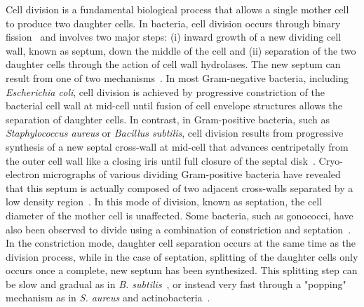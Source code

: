 Cell division is a fundamental biological process that allows a single mother cell to produce two daughter cells.
In bacteria, cell division occurs through binary fission~\cite{harryBacterialCellDivision2006} and involves two major steps: (i) inward growth of a new dividing cell wall, known as septum, down the middle of the cell and (ii) separation of the two daughter cells through the action of cell wall hydrolases.
The new septum can result from one of two mechanisms~\cite{ericksonHowBacterialCell2017}.
In most Gram-negative bacteria, including \textit{Escherichia coli}, cell division is achieved by progressive constriction of the bacterial cell wall at mid-cell until fusion of cell envelope structures allows the separation of daughter cells.
In contrast, in Gram-positive bacteria, such as \textit{Staphylococcus aureus} or \textit{Bacillus subtilis}, cell division results from progressive synthesis of a new septal cross-wall at mid-cell that advances centripetally from the outer cell wall like a closing iris until full closure of the septal disk~\cite{beveridgeUltrastructureGramPositiveCell2006,giesbrechtStaphylococcalCellWall1998}.
Cryo-electron micrographs of various dividing Gram-positive bacteria have revealed that this septum is actually composed of two adjacent cross-walls separated by a low density region~\cite{matiasNativeCellWall2006,matiasCryoelectronMicroscopyCell2007,zuberGranularLayerPeriplasmic2006,sextonSuperresolutionConfocalCryoCLEM2022,murrayCellDivisionDeinococcus1983}.
In this mode of division, known as septation, the cell diameter of the mother cell is unaffected.
Some bacteria, such as gonococci, have also been observed to divide using a combination of constriction and septation~\cite{westling-haggstromGrowthPatternCell1977}.
In the constriction mode, daughter cell separation occurs at the same time as the division process, while in the case of septation, splitting of the daughter cells only occurs once a complete, new septum has been synthesized.
This splitting step can be slow and gradual as in \textit{B. subtilis}~\cite{smithAutolysinsBacillusSubtilis2000}, or instead very fast through a "popping" mechanism as in \textit{S. aureus} and actinobacteria~\cite{monteiroCellShapeDynamics2015,zhouMechanicalCrackPropagation2015,zhouFastMechanicallyDriven2016}.

